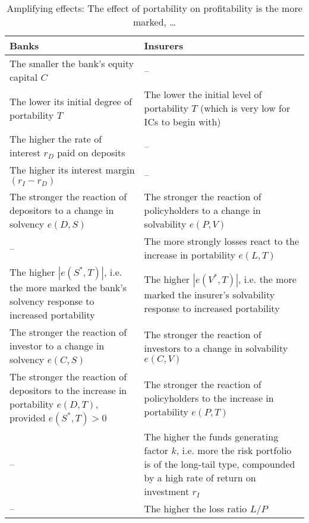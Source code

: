 \begin{table}[h!]
    \vspace{5mm}
    \begin{subtable}{\textwidth}
        \captionsetup{justification=raggedright, singlelinecheck=false, font=small}
        \caption{Amplifying effects: The effect of portability on profitability is the more marked, …} \label{tab:amplifying_effects}
        \renewcommand{\arraystretch}{2}
        \scriptsize
        \begin{tabular}{|p{7cm}|p{7cm}|}
            \hline 
            \textbf{Banks} & \textbf{Insurers} \\ \hline 
            The smaller the bank's equity capital $C$ & -- \\ \hline 
            The lower its initial degree of portability $T$ & The lower the initial level of portability $T$ (which is very low for ICs to begin with) \\ \hline 
            The higher the rate of interest $r_D$ paid on deposits & -- \\ \hline 
            The higher its interest margin $(r_I-r_D)$& --\\ \hline 
            The stronger the reaction of depositors to a change in solvency $e(D,S)$ & The stronger the reaction of policyholders to a change in solvability $e(P,V)$ \\ \hline 
            -- & The more strongly losses react to the increase in portability $e(L,T)$ \\ \hline 
            The higher $|e(S^*,T)|$, i.e. the more marked the bank's solvency response to increased portability & The higher $|e(V^*,T)|$, i.e. the more marked the insurer's solvability response to increased portability \\ \hline 
            The stronger the reaction of investor to a change in solvency $e(C,S)$ & The stronger the reaction of investors to a change in solvability $e(C,V)$ \\ \hline 
            The stronger the reaction of depositors to the increase in portability $e(D,T)$, provided $e(S^*,T)>0$ & The stronger the reaction of policyholders to the increase in portability $e(P,T)$ \\ \hline 
            -- & The higher the funds generating factor $k$, i.e. more the risk portfolio is of the long-tail type, compounded by a high rate of return on investment $r_I$ \\ \hline 
            -- & The higher the loss ratio $L/P$ \\ \hline
        \end{tabular}
    \end{subtable}
\end{table}